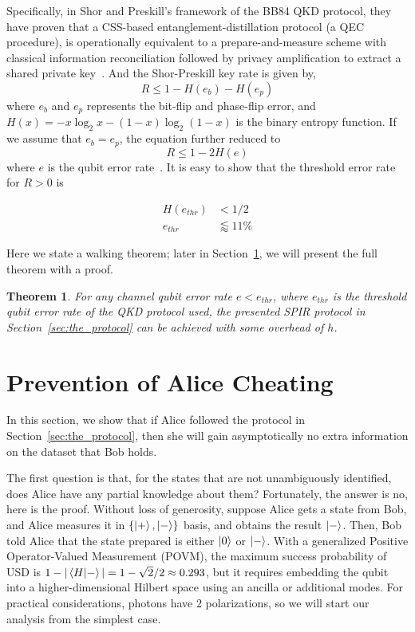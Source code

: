 \documentclass[%
 reprint,
superscriptaddress,
 amsmath,amssymb,
 aps,
]{revtex4-2}
\newtheorem{theorem}{Theorem}[section]
\begin{document}
Specifically, in Shor and Preskill's framework of the BB84 QKD protocol, they have proven that a CSS-based entanglement-distillation protocol (a QEC procedure), is operationally equivalent to a prepare-and-measure scheme with classical information reconciliation followed by privacy amplification to extract a shared private key~\cite{Shor_Preskill_Proof1}. And the Shor-Preskill key rate is given by,
\begin{equation}
    R\le 1-H(e_b)-H(e_p)
\end{equation}
where $e_b$ and $e_p$ represents the bit-flip and phase-flip error, and $H(x)=-x\log_2x-(1-x)\log_2(1-x)$ is the binary entropy function. If we assume that $e_b=e_p$, the equation further reduced to
\begin{equation}
    R \le 1-2H(e)
\end{equation}
where $e$ is the qubit error rate~\cite{Shor_Preskill_Proof1}. It is easy to show that the threshold error rate for $R>0$ is

\begin{equation}
\begin{split}
    H(e_{thr})&<1/2\\
    e_{thr}&\lessapprox 11\%
\end{split}
\end{equation}

Here we state a walking theorem; later in Section~\ref{sec:Alice_Cheating}, we will present the full theorem with a proof.

\begin{theorem}
    For any channel qubit error rate $e<e_{thr}$, where $e_{thr}$ is the threshold qubit error rate of the QKD protocol used, the presented SPIR protocol in Section~\ref{sec:the_protocol} can be achieved with some overhead of $h$.
\label{thm:walking_theorem}
\end{theorem}

\section{Prevention of Alice Cheating}
\label{sec:Alice_Cheating}

In this section, we show that if Alice followed the protocol in Section~\ref{sec:the_protocol}, then she will gain asymptotically no extra information on the dataset that Bob holds.

The first question is that, for the states that are not unambiguously identified, does Alice have any partial knowledge about them? Fortunately, the answer is no, here is the proof. Without loss of generosity, suppose Alice gets a state from Bob, and Alice measures it in $\{\ket{+}, \ket{-}\}$ basis, and obtains the result $\ket{-}$. Then, Bob told Alice that the state prepared is either $\ket{0}$ or $\ket{-}$. With a generalized Positive Operator-Valued Measurement (POVM), the maximum success probability of USD is $1-|\bra{H}\ket{-}|=1-\sqrt{2}/2\approx0.293$, but it requires embedding the qubit into a higher-dimensional Hilbert space using an ancilla or additional modes. For practical considerations, photons have 2 polarizations, so we will start our analysis from the simplest case.
\end{document}
